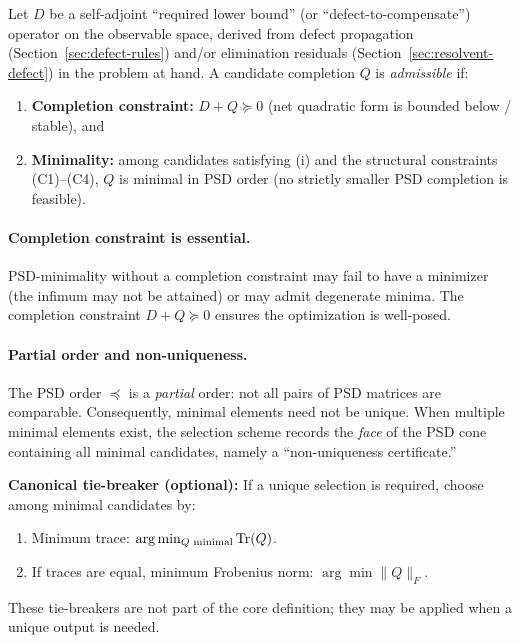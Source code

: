 \begin{definition}
\label{def:admissibility}
Let $D$ be a self-adjoint ``required lower bound'' (or ``defect-to-compensate'') operator on the observable space, derived from defect propagation (Section~\ref{sec:defect-rules}) and/or elimination residuals (Section~\ref{sec:resolvent-defect}) in the problem at hand.
A candidate completion $Q$ is \emph{admissible} if:
\begin{enumerate}[label=(\roman*)]
\item \textbf{Completion constraint:} $D + Q \succeq 0$ (net quadratic form is bounded below / stable), and
\item \textbf{Minimality:} among candidates satisfying (i) and the structural constraints (C1)--(C4), $Q$ is minimal in PSD order (no strictly smaller PSD completion is feasible).
\end{enumerate}
\end{definition}

\paragraph{Completion constraint is essential.}
\label{rem:completion-essential}
PSD-minimality without a completion constraint may fail to have a minimizer (the infimum may not be attained) or may admit degenerate minima.
The completion constraint $D + Q \succeq 0$ ensures the optimization is well-posed.

\paragraph{Partial order and non-uniqueness.}
\label{rem:psd-partial-order}
The PSD order $\preceq$ is a \emph{partial} order: not all pairs of PSD matrices are comparable.
Consequently, minimal elements need not be unique.
When multiple minimal elements exist, the selection scheme records the
\emph{face} of the PSD cone containing all minimal candidates, namely a
``non-uniqueness certificate.''

\smallskip\noindent
\textbf{Canonical tie-breaker (optional):}
If a unique selection is required, choose among minimal candidates by:
\begin{enumerate}[label=(\alph*)]
\item Minimum trace: $\arg\min_{Q \text{ minimal}} \mathrm{Tr}(Q)$.
\item If traces are equal, minimum Frobenius norm: $\arg\min \|Q\|_F$.
\end{enumerate}
These tie-breakers are not part of the core definition; they may be applied when a unique output is needed.

